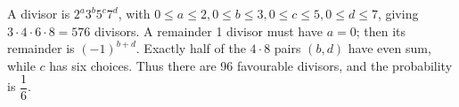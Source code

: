 A divisor is $2^a3^b5^c7^d$, with $0\le a\le2,0\le b\le3,0\le c\le5,0\le d\le7$, giving $3\cdot4\cdot6\cdot8=576$ divisors. A remainder 1 divisor must have $a=0$; then its remainder is $(-1)^{b+d}$. Exactly half of the $4\cdot8$ pairs $(b,d)$ have even sum, while $c$ has six choices. Thus there are 96 favourable divisors, and the probability is $\boxed{\dfrac{1}{6}}$.
